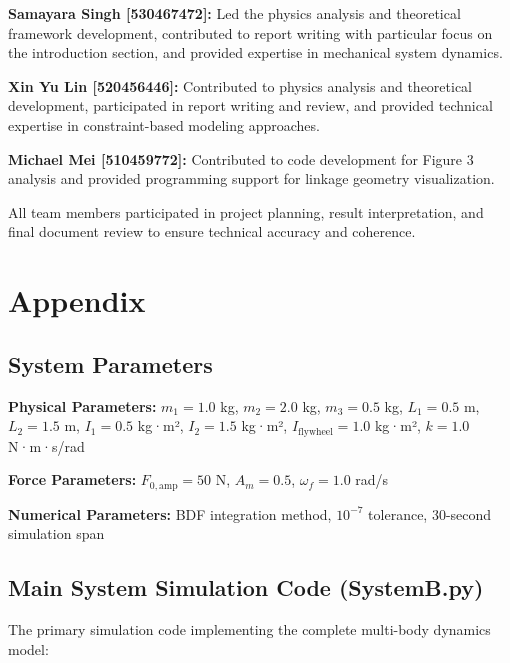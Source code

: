 \documentclass[10pt]{article}
\begin{document}
\textbf{Samayara Singh [530467472]:} Led the physics analysis and theoretical framework development, contributed to report writing with particular focus on the introduction section, and provided expertise in mechanical system dynamics.

\textbf{Xin Yu Lin [520456446]:} Contributed to physics analysis and theoretical development, participated in report writing and review, and provided technical expertise in constraint-based modeling approaches.

\textbf{Michael Mei [510459772]:} Contributed to code development for Figure 3 analysis and provided programming support for linkage geometry visualization.

All team members participated in project planning, result interpretation, and final document review to ensure technical accuracy and coherence.

\section{Appendix}

\subsection{System Parameters}
\textbf{Physical Parameters:} $m_1 = 1.0$ kg, $m_2 = 2.0$ kg, $m_3 = 0.5$ kg, $L_1 = 0.5$ m, $L_2 = 1.5$ m, $I_1 = 0.5$ kg·m², $I_2 = 1.5$ kg·m², $I_{\text{flywheel}} = 1.0$ kg·m², $k = 1.0$ N·m·s/rad

\textbf{Force Parameters:} $F_{0,\text{amp}} = 50$ N, $A_m = 0.5$, \(\omega_f = 1.0\) rad/s

\textbf{Numerical Parameters:} BDF integration method, $10^{-7}$ tolerance, 30-second simulation span

\subsection{Main System Simulation Code (SystemB.py)}

The primary simulation code implementing the complete multi-body dynamics model:
\end{document}
